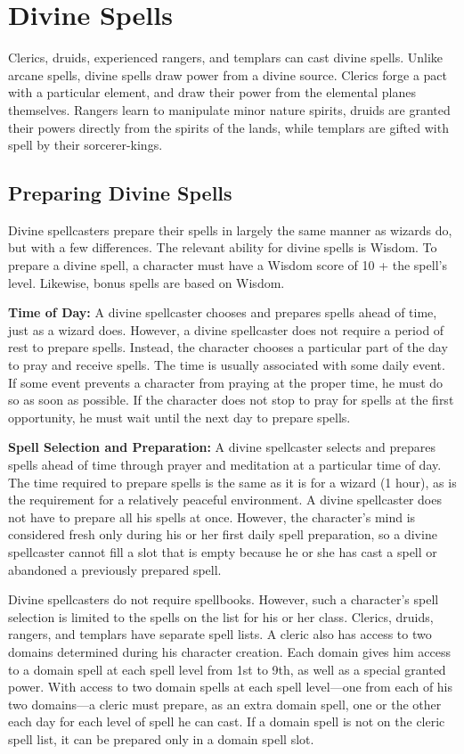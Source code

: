 \section{Divine Spells}
Clerics, druids, experienced rangers, and templars can cast divine spells. Unlike arcane spells, divine spells draw power from a divine source. Clerics forge a pact with a particular element, and draw their power from the elemental planes themselves. Rangers learn to manipulate minor nature spirits, druids are granted their powers directly from the spirits of the lands, while templars are gifted with spell by their sorcerer-kings.

\subsection{Preparing Divine Spells}
Divine spellcasters prepare their spells in largely the same manner as wizards do, but with a few differences. The relevant ability for divine spells is Wisdom. To prepare a divine spell, a character must have a Wisdom score of 10 + the spell's level. Likewise, bonus spells are based on Wisdom.

\textbf{Time of Day:} A divine spellcaster chooses and prepares spells ahead of time, just as a wizard does. However, a divine spellcaster does not require a period of rest to prepare spells. Instead, the character chooses a particular part of the day to pray and receive spells. The time is usually associated with some daily event. If some event prevents a character from praying at the proper time, he must do so as soon as possible. If the character does not stop to pray for spells at the first opportunity, he must wait until the next day to prepare spells.

\textbf{Spell Selection and Preparation:} A divine spellcaster selects and prepares spells ahead of time through prayer and meditation at a particular time of day. The time required to prepare spells is the same as it is for a wizard (1 hour), as is the requirement for a relatively peaceful environment. A divine spellcaster does not have to prepare all his spells at once. However, the character's mind is considered fresh only during his or her first daily spell preparation, so a divine spellcaster cannot fill a slot that is empty because he or she has cast a spell or abandoned a previously prepared spell.

Divine spellcasters do not require spellbooks. However, such a character's spell selection is limited to the spells on the list for his or her class. Clerics, druids, rangers, and templars have separate spell lists. A cleric also has access to two domains determined during his character creation. Each domain gives him access to a domain spell at each spell level from 1st to 9th, as well as a special granted power. With access to two domain spells at each spell level---one from each of his two domains---a cleric must prepare, as an extra domain spell, one or the other each day for each level of spell he can cast. If a domain spell is not on the cleric spell list, it can be prepared only in a domain spell slot.

